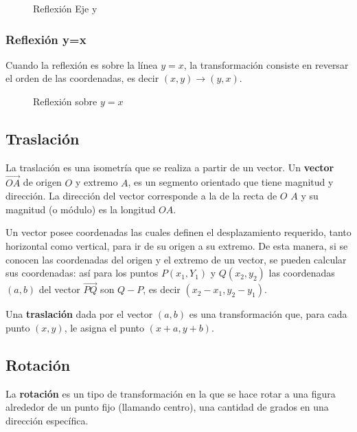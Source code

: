 \begin{figure}[h]
    \centering
    
    \caption{Reflexión Eje y}
    \label{fig:reflexion-x-axis}
\end{figure}

\subsubsection{Reflexión y=x}

Cuando la reflexión es sobre la línea $y=x$, la transformación consiste en reversar el orden de las coordenadas, es decir $(x,y) \to (y,x)$.

\begin{figure}[h]
    \centering
    
    \caption{Reflexión sobre $y=x$}
    \label{fig:reflexion-y-x}
\end{figure}

\clearpage

\subsection{Traslación}

La traslación es una isometría que se realiza a partir de un vector. Un \textbf{vector} $\overrightarrow{OA}$ de origen $O$ y extremo $A$, es un segmento orientado que tiene magnitud y dirección. La dirección del vector corresponde a la de la recta de $O$ $A$ y su magnitud (o módulo) es la longitud $OA$.

Un vector posee coordenadas las cuales definen el desplazamiento requerido, tanto horizontal como vertical, para ir de su origen a su extremo. De esta manera, si se conocen las coordenadas del origen y el extremo de un vector, se pueden calcular sus coordenadas: así para los puntos $P(x_1,Y_1)$ y $Q(x_2,y_2)$ las coordenadas $(a,b)$ del vector $\overrightarrow{PQ}$ son $Q-P$, es decir $(x_2-x_1,y_2-y_1)$.

Una \textbf{traslación} dada por el vector $(a,b)$ es una transformación que, para cada punto $(x,y)$, le asigna el punto $(x + a, y + b)$.

\subsection{Rotación}

La \textbf{rotación} es un tipo de transformación en la que se hace rotar a una figura alrededor de un punto fijo (llamando centro), una cantidad de grados en una dirección específica.


